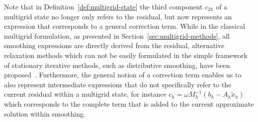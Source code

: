 Note that in Definition~\ref{def:multigrid-state} the third component $c_{2h}$ of a multigrid state no longer only refers to the residual, but now represents an expression that corresponds to a general correction term.
While in the classical multigrid formulation, as presented in Section~\ref{sec:multigrid-methods}, all smoothing expressions are directly derived from the residual, alternative relaxation methods which can not be easily formulated in the simple framework of stationary iterative methods, such as distributive smoothing, have been proposed~\cite{trottenberg2000multigrid}.
Furthermore, the general notion of a correction term enables us to also represent intermediate expressions that do not specifically refer to the current residual within a multigrid state, for instance $c_h = \omega M_h^{-1} \left( b_h - A_h \tilde{x}_h \right)$ which corresponds to the complete term that is added to the current approximate solution within smoothing.   
